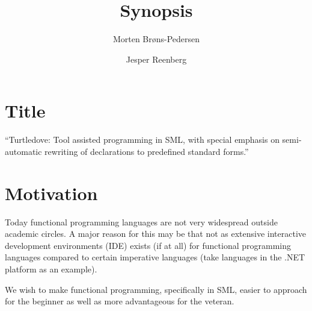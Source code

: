 \documentclass[a4paper,oneside]{article}
\author{Morten Brøns-Pedersen \and Jesper Reenberg}
\title{Synopsis}
\begin{document}
\maketitle






\section{Title}
``Turtledove: Tool assisted programming in SML, with special emphasis on semi-automatic rewriting of
declarations to predefined standard forms.''

\section{Motivation}
Today functional programming languages are not very widespread outside academic circles. A major
reason for this may be that not as extensive interactive development environments (IDE) exists (if
at all) for functional programming languages compared to certain imperative languages (take
languages in the .NET platform as an example).

We wish to make functional programming, specifically in SML, easier to approach for the beginner as
well as more advantageous for the veteran.
\end{document}

